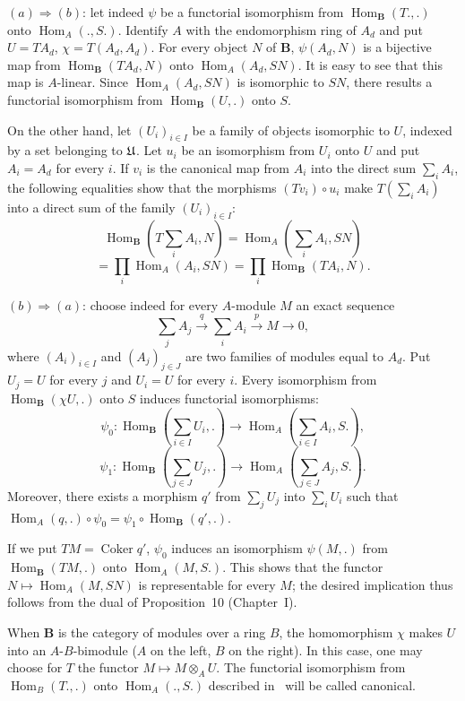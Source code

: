 $(a)\Rightarrow(b)$: let indeed $\psi$ be a functorial isomorphism
from $\operatorname{Hom}_{\mathbf B}(T.,.)$ onto
$\operatorname{Hom}_A(.,S.)$.  Identify $A$ with the endomorphism ring
of $A_d$ and put $U=TA_d$, $\chi=T(A_d,A_d)$.  For every object $N$ of
$\mathbf B$, $\psi(A_d,N)$ is a bijective map from
$\operatorname{Hom}_{\mathbf B}(TA_d,N)$ onto
$\operatorname{Hom}_A(A_d,SN)$.  It is easy to see that this map is
$A$-linear.  Since $\operatorname{Hom}_A(A_d,SN)$ is isomorphic to
$SN$, there results a functorial isomorphism from
$\operatorname{Hom}_{\mathbf B}(U,.)$ onto $S$.

On the other hand, let $(U_i)_{i\in I}$ be a family of objects
isomorphic to $U$, indexed by a set belonging to $\mathfrak{U}$.  Let $u_i$ be
an isomorphism from $U_i$ onto $U$ and put $A_i=A_d$ for every $i$.
If $v_i$ is the canonical map from $A_i$ into the direct sum
$\sum_i A_i$, the following equalities show that the morphisms
$(Tv_i)\circ u_i$ make $T(\sum_i A_i)$ into a direct sum of the family
$(U_i)_{i\in I}$:
\[
\operatorname{Hom}_{\mathbf B}\!\left(T\sum_i A_i,N\right)
  =\operatorname{Hom}_A\!\left(\sum_i A_i,SN\right)
\]
\[
=\prod_i\operatorname{Hom}_A(A_i,SN)
  =\prod_i\operatorname{Hom}_{\mathbf B}(TA_i,N).
\]

$(b)\Rightarrow(a)$: choose indeed for every $A$-module $M$ an exact
sequence
\[
\sum_j A_j \xrightarrow{q} \sum_i A_i \xrightarrow{p} M \to 0,
\]
where $(A_i)_{i\in I}$ and $(A_j)_{j\in J}$ are two families of modules
equal to $A_d$.  Put $U_j=U$ for every $j$ and $U_i=U$ for every $i$.
Every isomorphism from
$\operatorname{Hom}_{\mathbf B}(\chi U,.)$ onto $S$ induces functorial
isomorphisms:
\[
\psi_0\colon
  \operatorname{Hom}_{\mathbf B}\!\left(\sum_{i\in I}U_i,.\right)
  \to\operatorname{Hom}_A\!\left(\sum_{i\in I}A_i,S.\right),
\]
\[
\psi_1\colon
  \operatorname{Hom}_{\mathbf B}\!\left(\sum_{j\in J}U_j,.\right)
  \to\operatorname{Hom}_A\!\left(\sum_{j\in J}A_j,S.\right).
\]
Moreover, there exists a morphism $q'$ from $\sum_j U_j$ into
$\sum_i U_i$ such that
$\operatorname{Hom}_A(q,.)\circ\psi_0
  =\psi_1\circ\operatorname{Hom}_{\mathbf B}(q',.)$.

If we put $TM=\operatorname{Coker}q'$, $\psi_0$ induces an isomorphism
$\psi(M,.)$ from $\operatorname{Hom}_{\mathbf B}(TM,.)$ onto
$\operatorname{Hom}_A(M,S.)$.  This shows that the functor
$N\mapsto\operatorname{Hom}_A(M,SN)$ is representable for every $M$;
the desired implication thus follows from the dual of
Proposition~10 (Chapter~I).

When $\mathbf B$ is the category of modules over a ring $B$, the
homomorphism $\chi$ makes $U$ into an $A$-$B$-bimodule ($A$ on the
left, $B$ on the right).  In this case, one may choose for $T$ the
functor $M\mapsto M\otimes_A U$.  The functorial isomorphism from
$\operatorname{Hom}_B(T.,.)$ onto $\operatorname{Hom}_A(.,S.)$
described in~\cite{cartan-eilenberg} will be called canonical.


